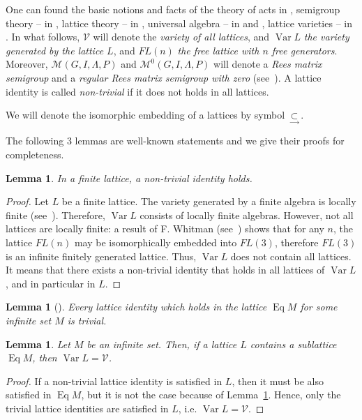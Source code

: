 \documentclass{birkau}
\numberwithin{equation}{section}
\theoremstyle{plain}
\newtheorem{lemma}[theorem]{Lemma}
\theoremstyle{definition}
\DeclareMathOperator{\Eq}{Eq}
\DeclareMathOperator{\Var}{Var}
\begin{document}
    One can found the basic notions and facts of the theory of acts in \cite{kilp}, semigroup theory -- in \cite{cliff}, lattice theory -- in \cite{gretz}, universal algebra -- in \cite{burris} and  \cite{kon}, lattice varieties -- in \cite{jipsen}. 	
    In what follows, $\mathcal{V}$ will denote the \textit{variety of all lattices}, and $\Var L$ \textit{the variety generated by the lattice $L$}, and $FL(n)$ \textit{the free lattice with $n$ free generators}. Moreover, $\mathcal{M}(G,I,\Lambda,P)$ and $\mathcal{M}^0(G,I,\Lambda,P)$ will denote a \textit{Rees matrix semigroup} and a \textit{regular Rees matrix semigroup with zero} (see~\cite[Chapter 2]{cliff}). A lattice identity is called \textit{non-trivial} if it does not holds in all lattices.
    
    We will denote the isomorphic embedding of a lattices by symbol $\underset\to \subset$.
	
	The following 3 lemmas are well-known statements and we give their proofs for completeness.
	
	\begin{lemma} \label{lb0}
	    In a finite lattice, a non-trivial identity holds.
	\end{lemma}
	\begin{proof}
	    Let $L$ be a finite lattice. The variety generated by a finite algebra is locally finite (see~\cite[Corollary 3.14]{kon}). Therefore, $\Var L$ consists of locally finite algebras. However, not all lattices are locally finite: a result of F. Whitman (see~\cite[Theorem 1.28]{free_lattices}) shows that for any $n$, the lattice $FL(n)$ may be isomorphically embedded into $FL(3)$, therefore $FL(3)$ is an infinite finitely generated lattice. Thus, $\Var L$ does not contain all lattices. It means that there exists a non-trivial identity that holds in all lattices of $\Var L$, and in particular in $L$.
	\end{proof}
	
	\begin{lemma}[\cite{sachs}] \label{lemma:b1}
	    Every lattice identity which holds in the lattice $\Eq M$ for some infinite set $M$ is trivial.
	\end{lemma}
	
	\begin{lemma} \label{la1}
	    Let $M$ be an infinite set. Then, if a lattice $L$ contains a sublattice $\Eq M$, then $\Var L = \mathcal{V}$.
	\end{lemma}
	\begin{proof}
	    If a non-trivial lattice identity is satisfied in $L$, then it must be also satisfied in $\Eq M$, but it is not the case because of Lemma~\ref{lemma:b1}. Hence, only the trivial lattice identities are satisfied in $L$, i.e. $\Var L = \mathcal{V}$.
	\end{proof}
\end{document}
